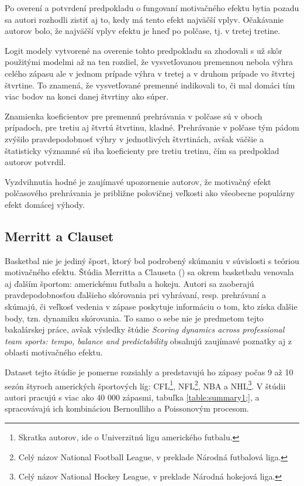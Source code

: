 \documentclass[
  digital, %
  oneside, %
  notable,   %
  lof,     %
  lot,     %
]{fithesis3}
\begin{document}
		Po overení a potvrdení predpokladu o fungovaní motivačného efektu bytia pozadu sa autori rozhodli zistiť aj to, kedy má tento efekt najväčší vplyv. Očakávanie autorov bolo, že najväčší vplyv efektu je hneď po polčase, tj. v tretej tretine.
		
		Logit modely vytvorené na overenie tohto predpokladu sa zhodovali s už skôr použitými modelmi až na ten rozdiel, že vysvetľovanou premennou nebola výhra celého zápasu ale v jednom prípade výhra v tretej a v druhom prípade vo štvrtej štvrtine. To znamená, že vysvetľované premenné indikovali to, či mal domáci tím viac bodov na konci danej štvrtiny ako súper. 
		
		Znamienka koeficientov pre premennú prehrávania v polčase sú v oboch prípadoch, pre tretiu aj štvrtú štvrtinu, kladné. Prehrávanie v polčase tým pádom zvýšilo pravdepodobnosť výhry v jednotlivých štvrtinách, avšak väčšie a štatisticky významné sú iba koeficienty pre tretiu tretinu, čím sa predpoklad autorov potvrdil. 			
			
		Vyzdvihnutia hodné je zaujímavé upozornenie autorov, že motivačný efekt polčasového prehrávania je približne polovičnej veľkosti ako všeobecne populárny efekt domácej výhody.

		\subsection{Merritt a Clauset}
		Basketbal nie je jediný šport, ktorý bol podrobený skúmaniu v súvislosti s teóriou motivačného efektu. Štúdia Merritta a Clauseta (\citeyear{merritt2014}) sa okrem basketbalu venovala aj ďalším športom: americkému futbalu a hokeju. Autori sa zaoberajú pravdepodobnosťou ďalšieho skórovania pri vyhrávaní, resp. prehrávaní a skúmajú, či veľkosť vedenia v zápase poskytuje informáciu o tom, kto získa ďalšie body, tzn. dynamiku skórovania. To samo o sebe nie je predmetom tejto bakalárskej práce, avšak výsledky štúdie \textit{Scoring dynamics across professional team sports: tempo, balance and predictability} obsahujú zaujímavé poznatky aj z oblasti motivačného efektu.
		
		Dataset tejto štúdie je pomerne rozsiahly a predstavujú ho zápasy počas 9 až 10  sezón štyroch amerických športových líg: CFL\footnote{Skratka autorov, ide o Univerzitnú ligu amerického futbalu.}, NFL\footnote{Celý názov National Football League, v preklade Národná futbalová liga.}, NBA a NHL\footnote{Celý názov National Hockey League, v preklade Národná hokejová liga.}. V štúdii autori pracujú s viac ako 40 000 zápasmi, tabuľka \ref{table:summary1;}, a spracovávajú ich kombináciou Bernoulliho a Poissonovým procesom.
	
\end{document}
